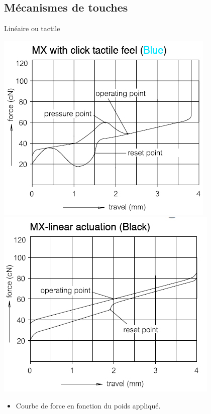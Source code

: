 \subsection{Mécanismes de touches}
\begin{frame}{Linéaire ou tactile}
	\begin{center}
		\includegraphics[scale=0.4]{images/hard_bluecurve} ~
		\includegraphics[scale=0.4]{images/hard_blackcurve}
	\end{center}
	\begin{itemize}
		\item Courbe de force en fonction du poids appliqué.
	\end{itemize}
\end{frame}

